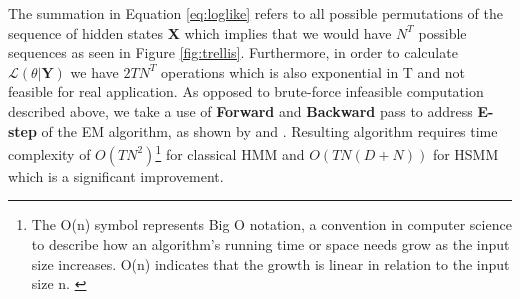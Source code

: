 The summation in Equation \ref{eq:loglike} refers to all possible permutations of the sequence of hidden states \textbf{X} 
which implies that we would have $N^T$ possible sequences as seen in Figure \ref{fig:trellis}. Furthermore, in order to calculate $\mathcal{L}( \theta| \textbf{Y})$ we have $2TN^T$ 
operations which is also exponential in T and not feasible for real application. As opposed to brute-force infeasible
computation described above, we take a use of \textbf{Forward} and \textbf{Backward} pass to address \textbf{E-step} of the EM algorithm, as shown by \citep{Bishop2006} and \citep{Rabiner1989}.
Resulting algorithm requires time complexity of $O(TN^2)$\footnote{The O(n) symbol represents Big O notation, 
a convention in computer science to describe how an algorithm's running time or space needs grow as the input size increases. 
O(n) indicates that the growth is linear in relation to the input size n. \citep{Mohr2014}} 
for classical HMM and $O(TN(D+N))$ for HSMM which is a significant improvement. 

